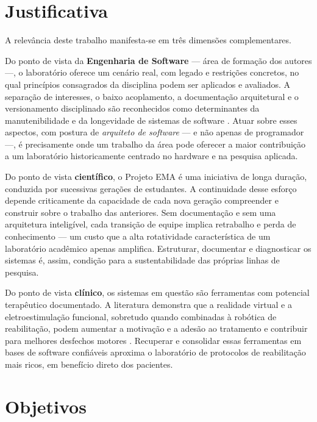 \section{Justificativa}
\label{sec:justificativa}

A relevância deste trabalho manifesta-se em três dimensões complementares.

Do ponto de vista da \textbf{Engenharia de Software} --- área de formação dos autores ---,
o laboratório oferece um cenário real, com legado e restrições concretos, no qual
princípios consagrados da disciplina podem ser aplicados e avaliados. A separação de
interesses, o baixo acoplamento, a documentação arquitetural e o versionamento disciplinado
são reconhecidos como determinantes da manutenibilidade e da longevidade de sistemas de
software \cite{sommerville2011}. Atuar sobre esses aspectos, com postura de \emph{arquiteto
de software} --- e não apenas de programador ---, é precisamente onde um trabalho da área
pode oferecer a maior contribuição a um laboratório historicamente centrado no hardware e
na pesquisa aplicada.

Do ponto de vista \textbf{científico}, o Projeto EMA é uma iniciativa de longa duração,
conduzida por sucessivas gerações de estudantes. A continuidade desse esforço depende
criticamente da capacidade de cada nova geração compreender e construir sobre o trabalho
das anteriores. Sem documentação e sem uma arquitetura inteligível, cada transição de
equipe implica retrabalho e perda de conhecimento --- um custo que a alta rotatividade
característica de um laboratório acadêmico apenas amplifica. Estruturar, documentar e
diagnosticar os sistemas é, assim, condição para a sustentabilidade das próprias linhas de
pesquisa.

Do ponto de vista \textbf{clínico}, os sistemas em questão são ferramentas com potencial
terapêutico documentado. A literatura demonstra que a realidade virtual e a
eletroestimulação funcional, sobretudo quando combinadas à robótica de reabilitação, podem
aumentar a motivação e a adesão ao tratamento e contribuir para melhores desfechos motores
\cite{loureiro2024,macchitella2023}. Recuperar e consolidar essas ferramentas em bases de
software confiáveis aproxima o laboratório de protocolos de reabilitação mais ricos, em
benefício direto dos pacientes.

\section{Objetivos}
\label{sec:objetivos}

